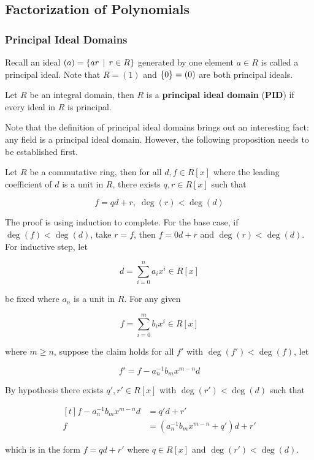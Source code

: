 \documentclass[a4paper,12pt]{article}
\begin{document}
\subsection{Factorization of Polynomials}
\subsubsection{Principal Ideal Domains}
Recall an ideal $(a)=\left\{ ar\,\mid\, r\in R\right\}$ generated by one element $a\in R$ is called a principal ideal. Note that $R=(1)$ and $\left\{ 0\right\}=(0)$ are both principal ideals.\n

\begin{dft}
  Let $R$ be an integral domain, then $R$ is a \textbf{principal ideal domain} (\textbf{PID}) if every ideal in $R$ is principal.
\end{dft}\n

Note that the definition of principal ideal domains brings out an interesting fact: any field is a principal ideal domain. However, the following proposition needs to be established first.\n

\begin{pst}
  Let $R$ be a commutative ring, then for all $d,f\in R[x]$ where the leading coefficient of $d$ is a unit in $R$, there exists $q,r\in R[x]$ such that

  $$f=qd+r,\;\deg(r)<\deg(d)$$\s

  \prf The proof is using induction to complete. For the base case, if $\deg(f)<\deg(d)$, take $r=f$, then $f=0d+r$ and $\deg(r)<\deg(d)$. For inductive step, let
  
  $$d=\sum_{i=0}^{n}a_{i}x^{i}\in R[x]$$\s
  
  be fixed where $a_{n}$ is a unit in $R$. For any given
  
  $$f=\sum_{i=0}^{m}b_{i}x^{i}\in R[x]$$\s

  where $m\geq n$, suppose the claim holds for all $f'$ with $\deg(f')<\deg(f)$, let

  $$f'=f-a_{n}^{-1}b_{m}x^{m-n}d$$\s

  By hypothesis there exists $q',r'\in R[x]$ with $\deg(r')<\deg(d)$ such that

  $$\begin{aligned}[t]
    f-a_{n}^{-1}b_{m}x^{m-n}d&=q'd+r'\\
    f&=(a_{n}^{-1}b_{m}x^{m-n}+q')d+r'
  \end{aligned}$$\s

  which is in the form $f=qd+r'$ where $q\in R[x]$ and $\deg(r')<\deg(d)$.
\end{pst}\n
\end{document}

